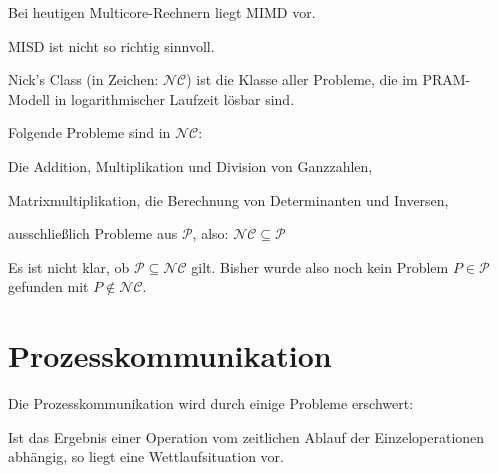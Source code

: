 Bei heutigen Multicore-Rechnern liegt MIMD vor.

MISD ist nicht so richtig sinnvoll.

\begin{definition}%
    Nick's Class (in Zeichen: $\mathcal{NC}$) ist die Klasse aller Probleme,
    die im PRAM-Modell in logarithmischer Laufzeit lösbar sind.
\end{definition}

\begin{beispiel}%
    Folgende Probleme sind in $\mathcal{NC}$:
    \begin{bspenum}
        \item Die Addition, Multiplikation und Division von Ganzzahlen,
        \item Matrixmultiplikation, die Berechnung von Determinanten und Inversen,
        \item ausschließlich Probleme aus $\mathcal{P}$, also: $\mathcal{NC} \subseteq \mathcal{P}$
    \end{bspenum}

    Es ist nicht klar, ob $\mathcal{P} \subseteq \mathcal{NC}$ gilt. Bisher 
    wurde also noch kein Problem $P \in \mathcal{P}$ gefunden mit $P \notin \mathcal{NC}$.
\end{beispiel}

\section{Prozesskommunikation}
Die Prozesskommunikation wird durch einige Probleme erschwert:

\begin{definition}[Wettlaufsituation]%
    Ist das Ergebnis einer Operation vom zeitlichen Ablauf der Einzeloperationen
    abhängig, so liegt eine Wettlaufsituation vor.
\end{definition}

